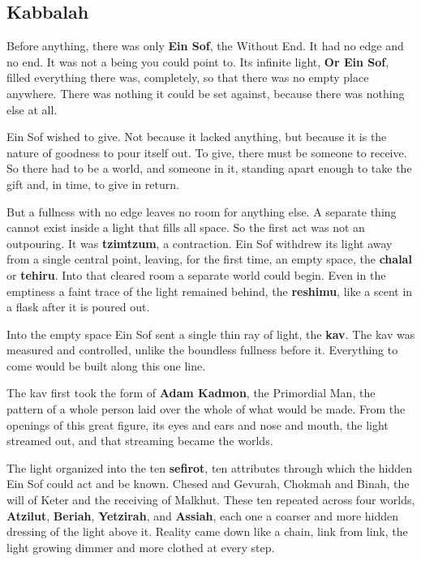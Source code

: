 
\subsection{Kabbalah}

Before anything, there was only \textbf{Ein Sof}, the Without End. It had no edge
and no end. It was not a being you could point to. Its infinite light,
\textbf{Or Ein Sof}, filled everything there was, completely, so that there was no
empty place anywhere. There was nothing it could be set against, because there was
nothing else at all.

Ein Sof wished to give. Not because it lacked anything, but because it is the nature
of goodness to pour itself out. To give, there must be someone to receive. So there
had to be a world, and someone in it, standing apart enough to take the gift and, in
time, to give in return.

But a fullness with no edge leaves no room for anything else. A separate thing
cannot exist inside a light that fills all space. So the first act was not an
outpouring. It was \textbf{tzimtzum}, a contraction. Ein Sof withdrew its light away
from a single central point, leaving, for the first time, an empty space, the
\textbf{chalal} or \textbf{tehiru}. Into that cleared room a separate world could
begin. Even in the emptiness a faint trace of the light remained behind, the
\textbf{reshimu}, like a scent in a flask after it is poured out.

Into the empty space Ein Sof sent a single thin ray of light, the \textbf{kav}. The
kav was measured and controlled, unlike the boundless fullness before it. Everything
to come would be built along this one line.

The kav first took the form of \textbf{Adam Kadmon}, the Primordial Man, the pattern
of a whole person laid over the whole of what would be made. From the openings of
this great figure, its eyes and ears and nose and mouth, the light streamed out, and
that streaming became the worlds.

The light organized into the ten \textbf{sefirot}, ten attributes through which the
hidden Ein Sof could act and be known. Chesed and Gevurah, Chokmah and Binah, the
will of Keter and the receiving of Malkhut. These ten repeated across four worlds,
\textbf{Atzilut}, \textbf{Beriah}, \textbf{Yetzirah}, and \textbf{Assiah}, each one
a coarser and more hidden dressing of the light above it. Reality came down like a
chain, link from link, the light growing dimmer and more clothed at every step.

